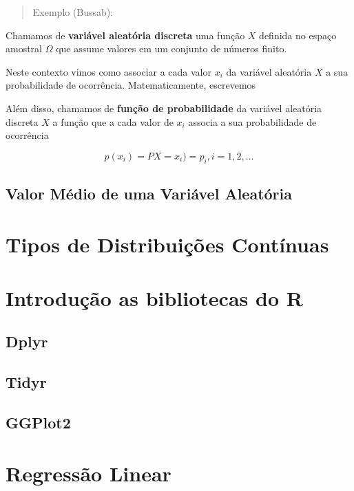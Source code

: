 \documentclass[
]{book}
\begin{document}
\begin{quote}
Exemplo (Bussab):
\end{quote}

Chamamos de \textbf{variável aleatória discreta} uma função \(X\) definida no espaço amostral \(\Omega\) que assume valores em um conjunto de números finito.

Neste contexto vimos como associar a cada valor \(x_i\) da variável aleatória \(X\) a sua probabilidade de ocorrência. Matematicamente, escrevemos

Além disso, chamamos de \textbf{função de probabilidade} da variável aleatória discreta \(X\) a função que a cada valor de \(x_i\) associa a sua probabilidade de ocorrência

\[
p(x_i) = PX=x_i) = p_i, i =1, 2, \dots
\]

\hypertarget{valor-muxe9dio-de-uma-variuxe1vel-aleatuxf3ria}{%
\section{Valor Médio de uma Variável Aleatória}\label{valor-muxe9dio-de-uma-variuxe1vel-aleatuxf3ria}}

\hypertarget{tipos-de-distribuiuxe7uxf5es-contuxednuas}{%
\chapter{Tipos de Distribuições Contínuas}\label{tipos-de-distribuiuxe7uxf5es-contuxednuas}}

\hypertarget{introduuxe7uxe3o-as-bibliotecas-do-r}{%
\chapter{Introdução as bibliotecas do R}\label{introduuxe7uxe3o-as-bibliotecas-do-r}}

\hypertarget{dplyr}{%
\section{Dplyr}\label{dplyr}}

\hypertarget{tidyr}{%
\section{Tidyr}\label{tidyr}}

\hypertarget{ggplot2}{%
\section{GGPlot2}\label{ggplot2}}

\hypertarget{regressuxe3o-linear}{%
\chapter{Regressão Linear}\label{regressuxe3o-linear}}

  
\end{document}
